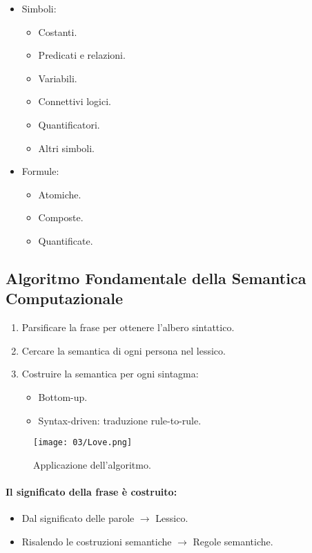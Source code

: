 \begin{itemize}
  \item Simboli:
    \begin{itemize}
      \item Costanti. 
      \item Predicati e relazioni. 
      \item Variabili. 
      \item Connettivi logici. 
      \item Quantificatori. 
      \item Altri simboli.
    \end{itemize}
  \item Formule:
    \begin{itemize}
      \item Atomiche. 
      \item Composte. 
      \item Quantificate.
    \end{itemize}
\end{itemize}

\subsection{Algoritmo Fondamentale della Semantica Computazionale}

\begin{enumerate}
  \item Parsificare la frase per ottenere l'albero sintattico. 
  \item Cercare la semantica di ogni persona nel lessico. 
  \item Costruire la semantica per ogni sintagma:
    \begin{itemize}
      \item Bottom-up. 
      \item Syntax-driven: traduzione rule-to-rule.
    \end{itemize}
\end{enumerate}


\begin{figure}[!h]
    \centering
    \texttt{[image: 03/Love.png]}
    \caption{Applicazione dell'algoritmo.}
\end{figure}

\paragraph{Il significato della frase è costruito:}
\begin{itemize}
  \item Dal significato delle parole $\rightarrow$ Lessico. 
  \item Risalendo le costruzioni semantiche $\rightarrow$ Regole semantiche.
\end{itemize}

